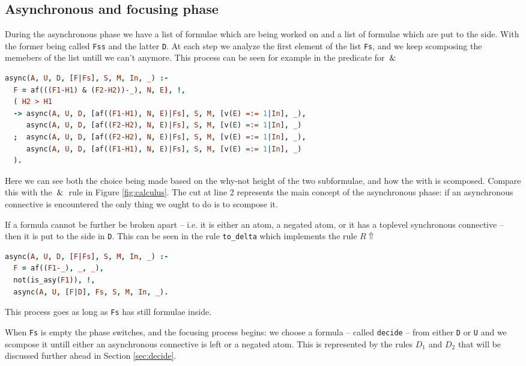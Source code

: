 \documentclass[a4paper, 12pt, tesi, english]{report}
\begin{document}
\subsection{Asynchronous and focusing phase}
During the asynchronous phase we have a list of formulae which are being worked on and a list of formulae which are put to the side.
With the former being called \texttt{Fss} and the latter \texttt{D}.
At each step we analyze the first element of the list \texttt{Fs}, and we keep scomposing the memebers of the list untill we can't anymore.
This process can be seen for example in the predicate for $\:\&\:$
\begin{lstlisting}[language=prolog]
async(A, U, D, [F|Fs], S, M, In, _) :-
  F = af(((F1-H1) & (F2-H2))-_), N, E), !,
  ( H2 > H1	
  -> async(A, U, D, [af((F1-H1), N, E)|Fs], S, M, [v(E) =:= 1|In], _), 
     async(A, U, D, [af((F2-H2), N, E)|Fs], S, M, [v(E) =:= 1|In], _) 
  ;  async(A, U, D, [af((F2-H2), N, E)|Fs], S, M, [v(E) =:= 1|In], _),
     async(A, U, D, [af((F1-H1), N, E)|Fs], S, M, [v(E) =:= 1|In], _)
  ).
\end{lstlisting}
Here we can see both the choice being made based on the why-not height of the two subformulae, and how the with is scomposed.
Compare this with the $\:\&\:$ rule in Figure \ref{fig:calculus}.
The cut at line 2 represents the main concept of the asynchronous phase: if an asynchronous connective is encountered the only thing we ought to do is to scompose it.

If a formula cannot be further be broken apart -- i.e. it is either an atom, a negated atom, or it has a toplevel synchronous connective -- then it is put to the side in \texttt{D}.
This can be seen in the rule \texttt{to\_delta} which implements the rule $R\!\Uparrow$
\begin{lstlisting}[language=prolog]
async(A, U, D, [F|Fs], S, M, In, _) :-
  F = af((F1-_), _, _),
  not(is_asy(F1)), !,
  async(A, U, [F|D], Fs, S, M, In, _).
\end{lstlisting}
This process goes as long as \texttt{Fs} has still formulae inside.

When \texttt{Fs} is empty the phase switches, and the focusing process begins: we choose a formula -- called \texttt{decide} -- from either \texttt{D} or \texttt{U} and we scompose it untill either an asynchronous connective is left or a negated atom.
This is represented by the rules $D_1$ and $D_2$ that will be discussed further ahead in Section \ref{sec:decide}.
\end{document}
